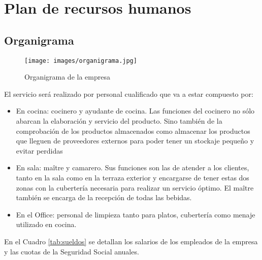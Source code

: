 \chapter{Plan de recursos humanos}
\label{chap:RRHH}

\section{Organigrama}
\label{sec:organigrama}

\begin{figure}[h]
    \texttt{[image: images/organigrama.jpg]}
    \caption{Organigrama de la empresa}
    \label{fig:organigrama}
\end{figure}

El servicio será realizado por personal cualificado que va a estar compuesto por:

\begin{itemize}
\item En cocina: cocinero y ayudante de cocina. Las funciones del cocinero no sólo abarcan la elaboración y servicio del producto. Sino también de la comprobación de los productos almacenados como almacenar los productos que lleguen de proveedores externos para poder tener un stockaje pequeño y evitar perdidas
\item En sala: maître y camarero. Sus funciones son las de atender a los clientes, tanto en la sala como en la terraza exterior y encargarse de tener estas dos zonas con la cubertería necesaria para realizar un servicio óptimo. El maître también se encarga de la recepción de todas las bebidas.
\item En el Office: personal de limpieza tanto para platos, cubertería como menaje utilizado en cocina.
\end{itemize}

En el Cuadro \ref{tab:sueldos} se detallan los salarios de los empleados de la empresa y las cuotas de la Seguridad Social anuales.

